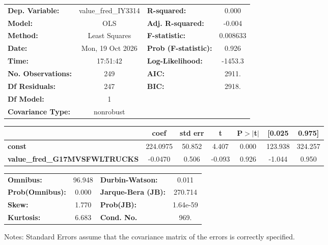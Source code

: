 \begin{center}
\begin{tabular}{lclc}
\toprule
\textbf{Dep. Variable:}               & value\_fred\_IY3314 & \textbf{  R-squared:         } &     0.000   \\
\textbf{Model:}                       &         OLS         & \textbf{  Adj. R-squared:    } &    -0.004   \\
\textbf{Method:}                      &    Least Squares    & \textbf{  F-statistic:       } &  0.008633   \\
\textbf{Date:}                        &   Mon, 19 Oct 2026  & \textbf{  Prob (F-statistic):} &    0.926    \\
\textbf{Time:}                        &       17:51:42      & \textbf{  Log-Likelihood:    } &   -1453.3   \\
\textbf{No. Observations:}            &           249       & \textbf{  AIC:               } &     2911.   \\
\textbf{Df Residuals:}                &           247       & \textbf{  BIC:               } &     2918.   \\
\textbf{Df Model:}                    &             1       & \textbf{                     } &             \\
\textbf{Covariance Type:}             &      nonrobust      & \textbf{                     } &             \\
\bottomrule
\end{tabular}
\begin{tabular}{lcccccc}
                                      & \textbf{coef} & \textbf{std err} & \textbf{t} & \textbf{P$> |$t$|$} & \textbf{[0.025} & \textbf{0.975]}  \\
\midrule
\textbf{const}                        &     224.0975  &       50.852     &     4.407  &         0.000        &      123.938    &      324.257     \\
\textbf{value\_fred\_G17MVSFWLTRUCKS} &      -0.0470  &        0.506     &    -0.093  &         0.926        &       -1.044    &        0.950     \\
\bottomrule
\end{tabular}
\begin{tabular}{lclc}
\textbf{Omnibus:}       & 96.948 & \textbf{  Durbin-Watson:     } &    0.011  \\
\textbf{Prob(Omnibus):} &  0.000 & \textbf{  Jarque-Bera (JB):  } &  270.714  \\
\textbf{Skew:}          &  1.770 & \textbf{  Prob(JB):          } & 1.64e-59  \\
\textbf{Kurtosis:}      &  6.683 & \textbf{  Cond. No.          } &     969.  \\
\bottomrule
\end{tabular}
\end{center}

Notes: \newline
 [1] Standard Errors assume that the covariance matrix of the errors is correctly specified.
